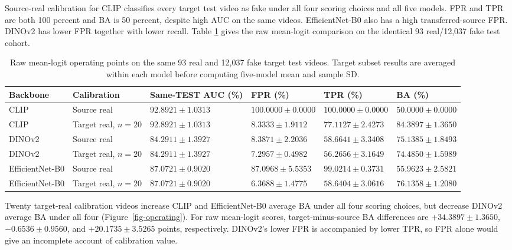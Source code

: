 \documentclass{ieeeaccess}
\begin{document}
Source-real calibration for CLIP classifies every target test video as
fake under all four scoring choices and all five models. FPR and TPR are
both 100 percent and BA is 50 percent, despite high AUC on the same
videos. EfficientNet-B0 also has a high transferred-source FPR. DINOv2
has lower FPR together with lower recall. Table \ref{tab:operating}
gives the raw mean-logit comparison on the identical 93 real/12,037 fake
test cohort.

\begin{table}[t]
\centering
\caption{Raw mean-logit operating points on the same 93 real and 12,037 fake target test videos. Target subset results are averaged within each model before computing five-model mean and sample SD.}
\label{tab:operating}
\setlength{\tabcolsep}{5pt}
\footnotesize
\begin{tabular}{llllll}
\toprule
Backbone & Calibration & Same-TEST AUC (\%) & FPR (\%) & TPR (\%) & BA (\%) \\
\midrule
CLIP & Source real & $92.8921\pm1.0313$ & $100.0000\pm0.0000$ & $100.0000\pm0.0000$ & $50.0000\pm0.0000$ \\
CLIP & Target real, $n=20$ & $92.8921\pm1.0313$ & $8.3333\pm1.9112$ & $77.1127\pm2.4273$ & $84.3897\pm1.3650$ \\
DINOv2 & Source real & $84.2911\pm1.3927$ & $8.3871\pm2.2036$ & $58.6641\pm3.3408$ & $75.1385\pm1.8493$ \\
DINOv2 & Target real, $n=20$ & $84.2911\pm1.3927$ & $7.2957\pm0.4982$ & $56.2656\pm3.1649$ & $74.4850\pm1.5989$ \\
EfficientNet-B0 & Source real & $87.0721\pm0.9020$ & $87.0968\pm5.5353$ & $99.0214\pm0.3731$ & $55.9623\pm2.5821$ \\
EfficientNet-B0 & Target real, $n=20$ & $87.0721\pm0.9020$ & $6.3688\pm1.4775$ & $58.6404\pm3.0616$ & $76.1358\pm1.2080$ \\
\bottomrule
\end{tabular}
\end{table}

Twenty target-real calibration videos increase CLIP and EfficientNet-B0
average BA under all four scoring choices, but decrease DINOv2 average
BA under all four (Figure~\ref{fig-operating}). For raw mean-logit
scores, target-minus-source BA differences are \(+34.3897\pm1.3650\),
\(-0.6536\pm0.9560\), and \(+20.1735\pm3.5265\) points, respectively.
DINOv2's lower FPR is accompanied by lower TPR, so FPR alone would give
an incomplete account of calibration value.
\end{document}
